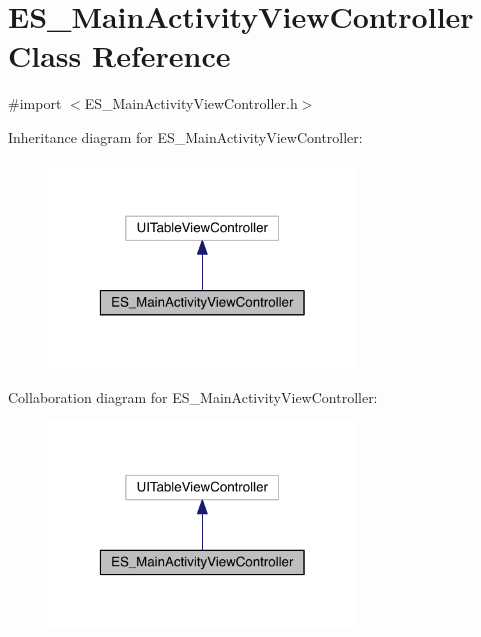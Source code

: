 \hypertarget{interface_e_s___main_activity_view_controller}{\section{E\+S\+\_\+\+Main\+Activity\+View\+Controller Class Reference}
\label{interface_e_s___main_activity_view_controller}
}


{\ttfamily \#import $<$E\+S\+\_\+\+Main\+Activity\+View\+Controller.\+h$>$}



Inheritance diagram for E\+S\+\_\+\+Main\+Activity\+View\+Controller\+:\nopagebreak
\begin{figure}[H]
\begin{center}
\leavevmode
\includegraphics[width=232pt]{d8/d39/interface_e_s___main_activity_view_controller__inherit__graph}
\end{center}
\end{figure}


Collaboration diagram for E\+S\+\_\+\+Main\+Activity\+View\+Controller\+:\nopagebreak
\begin{figure}[H]
\begin{center}
\leavevmode
\includegraphics[width=232pt]{d4/df8/interface_e_s___main_activity_view_controller__coll__graph}
\end{center}
\end{figure}
